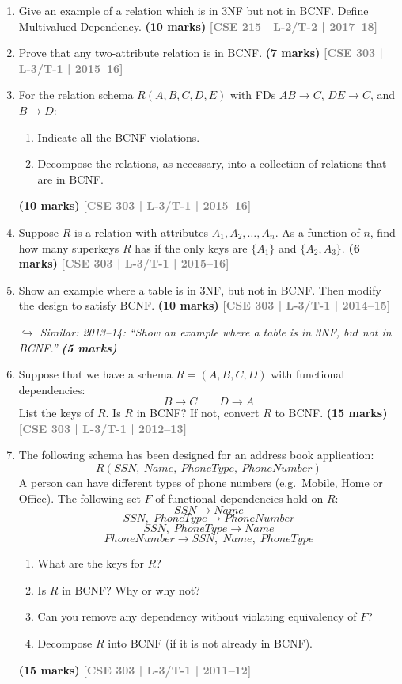\documentclass[12pt,a3paper]{article}
\newcommand{\yr}[1]{\hfill\textcolor{gray}{\small\textbf{[#1]}}}
\newcommand{\mk}[1]{\textcolor{orange!70!black}{\small\textbf{(#1 marks)}}}
\newcommand{\variant}[1]{\par\vspace{1pt}\textcolor{blue!50!black}%
  {\footnotesize\textit{$\hookrightarrow$ Similar: #1}}}
\begin{document}
\begin{enumerate}
\variant{2011--12: same question with additional subpart (iii) ``Can you remove any dependency without violating equivalency of $F$?''}

\item Give an example of a relation which is in 3NF but not in BCNF. Define Multivalued Dependency.
\mk{10} \yr{CSE 215 | L-2/T-2 | 2017--18}

\item Prove that any two-attribute relation is in BCNF.
\mk{7} \yr{CSE 303 | L-3/T-1 | 2015--16}

\item For the relation schema $R(A, B, C, D, E)$ with FDs $AB \to C$, $DE \to C$, and $B \to D$:
\begin{enumerate}
  \item Indicate all the BCNF violations.
  \item Decompose the relations, as necessary, into a collection of relations that are in BCNF.
\end{enumerate}
\mk{10} \yr{CSE 303 | L-3/T-1 | 2015--16}

\item Suppose $R$ is a relation with attributes $A_1, A_2, \ldots, A_n$. As a function of $n$, find how many superkeys $R$ has if the only keys are $\{A_1\}$ and $\{A_2, A_3\}$.
\mk{6} \yr{CSE 303 | L-3/T-1 | 2015--16}

\item Show an example where a table is in 3NF, but not in BCNF. Then modify the design to satisfy BCNF.
\mk{10} \yr{CSE 303 | L-3/T-1 | 2014--15}

\variant{2013--14: ``Show an example where a table is in 3NF, but not in BCNF.'' \mk{5}}

\item Suppose that we have a schema $R = (A, B, C, D)$ with functional dependencies:
\[B \to C \qquad D \to A\]
List the keys of $R$. Is $R$ in BCNF? If not, convert $R$ to BCNF.
\mk{15} \yr{CSE 303 | L-3/T-1 | 2012--13}

\item The following schema has been designed for an address book application:
\[R(SSN,\ Name,\ PhoneType,\ PhoneNumber)\]
A person can have different types of phone numbers (e.g.\ Mobile, Home or Office). The following set $F$ of functional dependencies hold on $R$:
\[SSN \to Name\]
\[SSN,\;PhoneType \to PhoneNumber\]
\[SSN,\;PhoneType \to Name\]
\[PhoneNumber \to SSN,\;Name,\;PhoneType\]
\begin{enumerate}
  \item What are the keys for $R$?
  \item Is $R$ in BCNF? Why or why not?
  \item Can you remove any dependency without violating equivalency of $F$?
  \item Decompose $R$ into BCNF (if it is not already in BCNF).
\end{enumerate}
\mk{15} \yr{CSE 303 | L-3/T-1 | 2011--12}


\end{enumerate}
\end{document}
